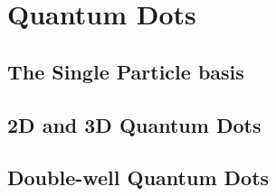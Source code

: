 \section{Quantum Dots}

\subsection{The Single Particle basis}

\subsection{2D and 3D Quantum Dots}

\subsection{Double-well Quantum Dots}






